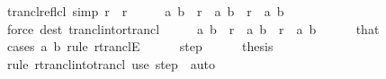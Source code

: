 \begin{isabellebody}
\isanewline
{}\isamarkupfalse%
\ trancl{\isacharunderscore}{\kern0pt}reflcl\ {\isacharbrackleft}{\kern0pt}simp{\isacharbrackright}{\kern0pt}{\isacharcolon}{\kern0pt}\ {\isachardoublequoteopen}{\isacharparenleft}{\kern0pt}r\isactrlsup {\isacharequal}{\kern0pt}{\isacharparenright}{\kern0pt}\isactrlsup {\isacharplus}{\kern0pt}\ {\isacharequal}{\kern0pt}\ r\isactrlsup {\isacharasterisk}{\kern0pt}{\isachardoublequoteclose}\isanewline
%
\isadelimproof
%
\endisadelimproof
%
\isatagproof
{}\isamarkupfalse%
\ {\isacharminus}{\kern0pt}\isanewline
\ \ \isamarkupfalse%
\ {\isachardoublequoteopen}{\isacharparenleft}{\kern0pt}a{\isacharcomma}{\kern0pt}\ b{\isacharparenright}{\kern0pt}\ {\isasymin}\ {\isacharparenleft}{\kern0pt}r\isactrlsup {\isacharequal}{\kern0pt}{\isacharparenright}{\kern0pt}\isactrlsup {\isacharplus}{\kern0pt}\ {\isasymLongrightarrow}\ {\isacharparenleft}{\kern0pt}a{\isacharcomma}{\kern0pt}\ b{\isacharparenright}{\kern0pt}\ {\isasymin}\ r\isactrlsup {\isacharasterisk}{\kern0pt}{\isachardoublequoteclose}\ \ a\ b\isanewline
\ \ \ \ \isamarkupfalse%
\ {\isacharparenleft}{\kern0pt}force\ dest{\isacharcolon}{\kern0pt}\ trancl{\isacharunderscore}{\kern0pt}into{\isacharunderscore}{\kern0pt}rtrancl{\isacharparenright}{\kern0pt}\isanewline
\ \ \isamarkupfalse%
\ \isamarkupfalse%
\ {\isachardoublequoteopen}{\isacharparenleft}{\kern0pt}a{\isacharcomma}{\kern0pt}\ b{\isacharparenright}{\kern0pt}\ {\isasymin}\ {\isacharparenleft}{\kern0pt}r\isactrlsup {\isacharequal}{\kern0pt}{\isacharparenright}{\kern0pt}\isactrlsup {\isacharplus}{\kern0pt}{\isachardoublequoteclose}\ \ {\isachardoublequoteopen}{\isacharparenleft}{\kern0pt}a{\isacharcomma}{\kern0pt}\ b{\isacharparenright}{\kern0pt}\ {\isasymin}\ r\isactrlsup {\isacharasterisk}{\kern0pt}{\isachardoublequoteclose}\ \ a\ b\isanewline
\ \ \ \ \isamarkupfalse%
\ that\isanewline
\ \ \isamarkupfalse%
\ {\isacharparenleft}{\kern0pt}cases\ a\ b\ rule{\isacharcolon}{\kern0pt}\ rtranclE{\isacharparenright}{\kern0pt}\isanewline
\ \ \ \ \isamarkupfalse%
\ step\isanewline
\ \ \ \ \isamarkupfalse%
\ {\isacharquery}{\kern0pt}thesis\isanewline
\ \ \ \ \ \ \isamarkupfalse%
\ {\isacharparenleft}{\kern0pt}rule\ rtrancl{\isacharunderscore}{\kern0pt}into{\isacharunderscore}{\kern0pt}trancl{}{\isacharparenright}{\kern0pt}\ {\isacharparenleft}{\kern0pt}use\ step\ \ auto{\isacharparenright}{\kern0pt}\isanewline

\end{isabellebody}
